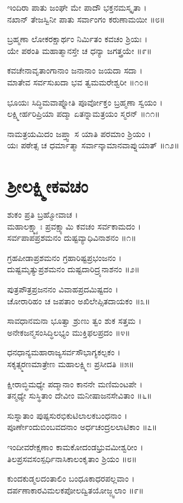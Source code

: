 ಇಂದಿರಾ ಪಾತು ಜಂಘೇ ಮೇ ಪಾದೌ ಭಕ್ತನಮಸ್ಕೃತಾ ।\\
ನಖಾನ್ ತೇಜಸ್ವಿನೀ ಪಾತು ಸರ್ವಾಂಗಂ ಕರುಣಾಮಯೀ ॥೮॥

ಬ್ರಹ್ಮಣಾ ಲೋಕರಕ್ಷಾರ್ಥಂ ನಿರ್ಮಿತಂ ಕವಚಂ ಶ್ರಿಯಃ ।\\
ಯೇ ಪಠಂತಿ ಮಹಾತ್ಮಾನಸ್ತೇ ಚ ಧನ್ಯಾ ಜಗತ್ತ್ರಯೇ ॥೯॥

ಕವಚೇನಾವೃತಾಂಗಾನಾಂ ಜನಾನಾಂ ಜಯದಾ ಸದಾ ।\\
ಮಾತೇವ ಸರ್ವಸುಖದಾ ಭವ ತ್ವಮಮರೇಶ್ವರೀ ॥೧೦॥

ಭೂಯಃ ಸಿದ್ಧಿಮವಾಪ್ನೋತಿ ಪೂರ್ವೋಕ್ತಂ ಬ್ರಹ್ಮಣಾ ಸ್ವಯಂ ।\\
ಲಕ್ಷ್ಮೀರ್ಹರಿಪ್ರಿಯಾ ಪದ್ಮಾ ಏತನ್ನಾಮತ್ರಯಂ ಸ್ಮರನ್ ॥೧೧॥

ನಾಮತ್ರಯಮಿದಂ ಜಪ್ತ್ವಾ ಸ ಯಾತಿ ಪರಮಾಂ ಶ್ರಿಯಂ ।\\
ಯಃ ಪಠೇತ್ಸ ಚ ಧರ್ಮಾತ್ಮಾ ಸರ್ವಾನ್ಕಾಮಾನವಾಪ್ನುಯಾತ್ ॥೧೨॥
\section{ಶ್ರೀಲಕ್ಷ್ಮೀಕವಚಂ}

ಶುಕಂ ಪ್ರತಿ ಬ್ರಹ್ಮೋವಾಚ ।\\
ಮಹಾಲಕ್ಷ್ಮ್ಯಾಃ ಪ್ರವಕ್ಷ್ಯಾಮಿ ಕವಚಂ ಸರ್ವಕಾಮದಂ ।\\
ಸರ್ವಪಾಪಪ್ರಶಮನಂ ದುಷ್ಟವ್ಯಾಧಿವಿನಾಶನಂ ॥೧॥

ಗ್ರಹಪೀಡಾಪ್ರಶಮನಂ ಗ್ರಹಾರಿಷ್ಟಪ್ರಭಂಜನಂ ।\\
ದುಷ್ಟಮೃತ್ಯುಪ್ರಶಮನಂ ದುಷ್ಟದಾರಿದ್ರ್ಯನಾಶನಂ ॥೨॥

ಪುತ್ರಪೌತ್ರಪ್ರಜನನಂ ವಿವಾಹಪ್ರದಮಿಷ್ಟದಂ ।\\
ಚೋರಾರಿಹಂ ಚ ಜಪತಾಂ ಅಖಿಲೇಪ್ಸಿತದಾಯಕಂ ॥೩॥

ಸಾವಧಾನಮನಾ ಭೂತ್ವಾ ಶ್ರುಣು ತ್ವಂ ಶುಕ ಸತ್ತಮ ।\\
ಅನೇಕಜನ್ಮಸಂಸಿದ್ಧಿಲಭ್ಯಂ ಮುಕ್ತಿಫಲಪ್ರದಂ ॥೪॥

ಧನಧಾನ್ಯಮಹಾರಾಜ್ಯಸರ್ವಸೌಭಾಗ್ಯಕಲ್ಪಕಂ ।\\
ಸಕೃತ್ಸ್ಮರಣಮಾತ್ರೇಣ ಮಹಾಲಕ್ಷ್ಮೀಃ ಪ್ರಸೀದತಿ ॥೫॥

ಕ್ಷೀರಾಬ್ಧಿಮಧ್ಯೇ ಪದ್ಮಾನಾಂ ಕಾನನೇ ಮಣಿಮಂಟಪೇ ।\\
ತನ್ಮಧ್ಯೇ ಸುಸ್ಥಿತಾಂ ದೇವೀಂ ಮನೀಷಾಜನಸೇವಿತಾಂ ॥೬॥

ಸುಸ್ನಾತಾಂ ಪುಷ್ಪಸುರಭಿಕುಟಿಲಾಲಕಬಂಧನಾಂ ।\\
ಪೂರ್ಣೇಂದುಬಿಂಬವದನಾಂ ಅರ್ಧಚಂದ್ರಲಲಾಟಿಕಾಂ ॥೭॥

ಇಂದೀವರೇಕ್ಷಣಾಂ ಕಾಮಕೋದಂಡಭ್ರುವಮೀಶ್ವರೀಂ ।\\
ತಿಲಪ್ರಸವಸಂಸ್ಪರ್ಧಿನಾಸಿಕಾಲಂಕೃತಾಂ ಶ್ರಿಯಂ ॥೮॥

ಕುಂದಕುಡ್ಮಲದಂತಾಲಿಂ ಬಂಧೂಕಾಧರಪಲ್ಲವಾಂ ।\\
ದರ್ಪಣಾಕಾರವಿಮಲಕಪೋಲದ್ವಿತಯೋಜ್ಜ್ವಲಾಂ ॥೯॥

